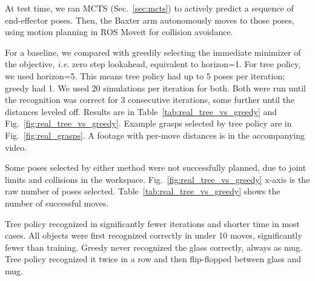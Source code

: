 \documentclass[letterpaper, 10 pt, conference]{ieeeconf}  %
\newcommand{\TODO}[1]{{\color{red}TODO: #1}}
\begin{document}

At test time, we ran MCTS (Sec.~\ref{sec:mcts}) to actively predict a sequence of end-effector poses. Then, the Baxter arm autonomously moves to those poses, using motion planning in ROS Moveit for collision avoidance.

For a baseline, we compared with greedily selecting the immediate minimizer of the objective, \textit{i.e.} zero step lookahead, equivalent to horizon=1. For tree policy, we used horizon=5. This means tree policy had up to 5 poses per iteration; greedy had 1. We used 20 simulations per iteration for both.
Both were run until the recognition was correct for 3 consecutive iterations, some further until the distances leveled off.
Results are in Table~\ref{tab:real_tree_vs_greedy} and Fig.~\ref{fig:real_tree_vs_greedy}. Example grasps selected by tree policy are in Fig.~\ref{fig:real_grasps}. A footage with per-move distances is in the accompanying video.

Some poses selected by either method were not successfully planned, due to joint limits and collisions in the workspace.
Fig.~\ref{fig:real_tree_vs_greedy} x-axis is the raw number of poses selected.
Table~\ref{tab:real_tree_vs_greedy} shows the number of successful moves.

Tree policy recognized in significantly fewer iterations and shorter time in most cases. All objects were first recognized correctly in under 10 moves, significantly fewer than training.
Greedy never recognized the glass correctly, always as mug. Tree policy recognized it twice in a row and then flip-flopped between glass and mug.
\end{document}
